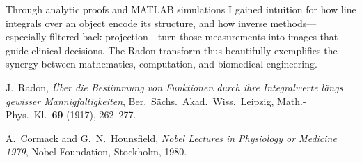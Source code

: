 \documentclass[11pt]{article}
\begin{document}
Through analytic proofs and MATLAB simulations I gained intuition for
how line integrals over an object encode its structure, and how inverse
methods---especially filtered back-projection---turn those measurements
into images that guide clinical decisions.  The Radon transform thus
beautifully exemplifies the synergy between mathematics, computation,
and biomedical engineering.

\begin{thebibliography}{9}
J.~Radon, \emph{Über die Bestimmung von Funktionen durch ihre Integralwerte
längs gewisser Mannigfaltigkeiten}, Ber.\ Sächs.\ Akad.\ Wiss.\ Leipzig,
Math.-Phys.\ Kl.\ \textbf{69} (1917), 262–277.

A.~Cormack and G.~N.~Hounsfield, \emph{Nobel Lectures in Physiology or Medicine
1979}, Nobel Foundation, Stockholm, 1980.

\end{thebibliography}
\end{document}
